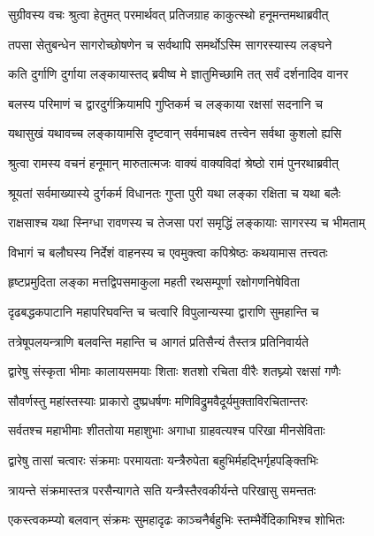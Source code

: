 
\twolineshloka
{सुग्रीवस्य वचः श्रुत्वा हेतुमत् परमार्थवत्}
{प्रतिजग्राह काकुत्स्थो हनूमन्तमथाब्रवीत्} %

\twolineshloka
{तपसा सेतुबन्धेन सागरोच्छोषणेन च}
{सर्वथापि समर्थोऽस्मि सागरस्यास्य लङ्घने} %

\twolineshloka
{कति दुर्गाणि दुर्गाया लङ्कायास्तद् ब्रवीष्व मे}
{ज्ञातुमिच्छामि तत् सर्वं दर्शनादिव वानर} %

\twolineshloka
{बलस्य परिमाणं च द्वारदुर्गक्रियामपि}
{गुप्तिकर्म च लङ्काया रक्षसां सदनानि च} %

\twolineshloka
{यथासुखं यथावच्च लङ्कायामसि दृष्टवान्}
{सर्वमाचक्ष्व तत्त्वेन सर्वथा कुशलो ह्यसि} %

\twolineshloka
{श्रुत्वा रामस्य वचनं हनूमान् मारुतात्मजः}
{वाक्यं वाक्यविदां श्रेष्ठो रामं पुनरथाब्रवीत्} %

\twolineshloka
{श्रूयतां सर्वमाख्यास्ये दुर्गकर्म विधानतः}
{गुप्ता पुरी यथा लङ्का रक्षिता च यथा बलैः} %

\twolineshloka
{राक्षसाश्च यथा स्निग्धा रावणस्य च तेजसा}
{परां समृद्धिं लङ्कायाः सागरस्य च भीमताम्} %

\twolineshloka
{विभागं च बलौघस्य निर्देशं वाहनस्य च}
{एवमुक्त्वा कपिश्रेष्ठः कथयामास तत्त्वतः} %

\twolineshloka
{हृष्टप्रमुदिता लङ्का मत्तद्विपसमाकुला}
{महती रथसम्पूर्णा रक्षोगणनिषेविता} %

\twolineshloka
{दृढबद्धकपाटानि महापरिघवन्ति च}
{चत्वारि विपुलान्यस्या द्वाराणि सुमहान्ति च} %

\twolineshloka
{तत्रेषूपलयन्त्राणि बलवन्ति महान्ति च}
{आगतं प्रतिसैन्यं तैस्तत्र प्रतिनिवार्यते} %

\twolineshloka
{द्वारेषु संस्कृता भीमाः कालायसमयाः शिताः}
{शतशो रचिता वीरैः शतघ्न्यो रक्षसां गणैः} %

\twolineshloka
{सौवर्णस्तु महांस्तस्याः प्राकारो दुष्प्रधर्षणः}
{मणिविद्रुमवैदूर्यमुक्ताविरचितान्तरः} %

\twolineshloka
{सर्वतश्च महाभीमाः शीततोया महाशुभाः}
{अगाधा ग्राहवत्यश्च परिखा मीनसेविताः} %

\twolineshloka
{द्वारेषु तासां चत्वारः संक्रमाः परमायताः}
{यन्त्रैरुपेता बहुभिर्महद्भिर्गृहपङ्क्तिभिः} %

\twolineshloka
{त्रायन्ते संक्रमास्तत्र परसैन्यागते सति}
{यन्त्रैस्तैरवकीर्यन्ते परिखासु समन्ततः} %

\twolineshloka
{एकस्त्वकम्प्यो बलवान् संक्रमः सुमहादृढः}
{काञ्चनैर्बहुभिः स्तम्भैर्वेदिकाभिश्च शोभितः} %

